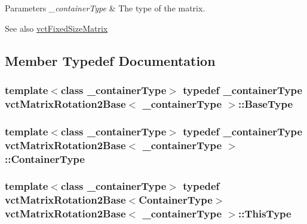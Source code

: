 \begin{DoxyParams}{Parameters}
{\em \+\_\+container\+Type} & The type of the matrix.\\
\hline
\end{DoxyParams}
\begin{DoxySeeAlso}{See also}
\hyperlink{classvct_fixed_size_matrix}{vct\+Fixed\+Size\+Matrix} 
\end{DoxySeeAlso}


\subsection{Member Typedef Documentation}
\hypertarget{classvct_matrix_rotation2_base_a3ce93aa444c1fadbc26ed0d5582ad33a}{}
\subsubsection[{Base\+Type}]{\setlength{\rightskip}{0pt plus 5cm}template$<$class \+\_\+container\+Type$>$ typedef \+\_\+container\+Type {\bf vct\+Matrix\+Rotation2\+Base}$<$ \+\_\+container\+Type $>$\+::{\bf Base\+Type}}\label{classvct_matrix_rotation2_base_a3ce93aa444c1fadbc26ed0d5582ad33a}
\hypertarget{classvct_matrix_rotation2_base_ace2b6ba4773b1688b757cec782686180}{}
\subsubsection[{Container\+Type}]{\setlength{\rightskip}{0pt plus 5cm}template$<$class \+\_\+container\+Type$>$ typedef \+\_\+container\+Type {\bf vct\+Matrix\+Rotation2\+Base}$<$ \+\_\+container\+Type $>$\+::{\bf Container\+Type}}\label{classvct_matrix_rotation2_base_ace2b6ba4773b1688b757cec782686180}
\hypertarget{classvct_matrix_rotation2_base_a47ffeef2ddecede4b16bcc88fb432ff5}{}
\subsubsection[{This\+Type}]{\setlength{\rightskip}{0pt plus 5cm}template$<$class \+\_\+container\+Type$>$ typedef {\bf vct\+Matrix\+Rotation2\+Base}$<${\bf Container\+Type}$>$ {\bf vct\+Matrix\+Rotation2\+Base}$<$ \+\_\+container\+Type $>$\+::{\bf This\+Type}}\label{classvct_matrix_rotation2_base_a47ffeef2ddecede4b16bcc88fb432ff5}
\hypertarget{classvct_matrix_rotation2_base_abd9a728263fc154b76fecac0d9c19c4d}{}
